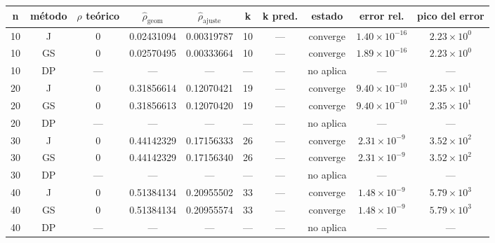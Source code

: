 {\scriptsize
\begin{tabular}{cccccccccc}
\toprule
\rowcolor{Azul1!50}
n & método & $\rho$ teórico & $\hat\rho_{\mathrm{geom}}$ & $\hat\rho_{\mathrm{ajuste}}$ & k & k pred. & estado & error rel. & pico del error \\
\midrule
10 & J & 0 & 0.02431094 & 0.00319787 & 10 & --- & converge & $1.40\times10^{-16}$ & $2.23\times10^{0}$ \\
10 & GS & 0 & 0.02570495 & 0.00333664 & 10 & --- & converge & $1.89\times10^{-16}$ & $2.23\times10^{0}$ \\
10 & DP & --- & --- & --- & --- & --- & no aplica & --- & --- \\
20 & J & 0 & 0.31856614 & 0.12070421 & 19 & --- & converge & $9.40\times10^{-10}$ & $2.35\times10^{1}$ \\
20 & GS & 0 & 0.31856613 & 0.12070420 & 19 & --- & converge & $9.40\times10^{-10}$ & $2.35\times10^{1}$ \\
20 & DP & --- & --- & --- & --- & --- & no aplica & --- & --- \\
30 & J & 0 & 0.44142329 & 0.17156333 & 26 & --- & converge & $2.31\times10^{-9}$ & $3.52\times10^{2}$ \\
30 & GS & 0 & 0.44142329 & 0.17156340 & 26 & --- & converge & $2.31\times10^{-9}$ & $3.52\times10^{2}$ \\
30 & DP & --- & --- & --- & --- & --- & no aplica & --- & --- \\
40 & J & 0 & 0.51384134 & 0.20955502 & 33 & --- & converge & $1.48\times10^{-9}$ & $5.79\times10^{3}$ \\
40 & GS & 0 & 0.51384134 & 0.20955574 & 33 & --- & converge & $1.48\times10^{-9}$ & $5.79\times10^{3}$ \\
40 & DP & --- & --- & --- & --- & --- & no aplica & --- & --- \\
\bottomrule
\end{tabular}}

